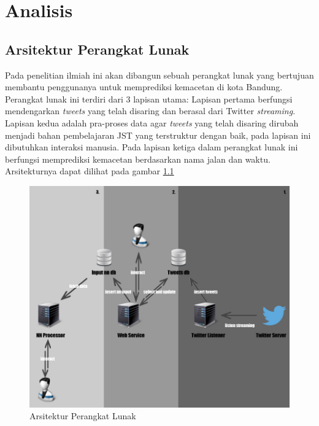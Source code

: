 \chapter{Analisis}
\section{Arsitektur Perangkat Lunak}
Pada penelitian ilmiah ini akan dibangun sebuah perangkat lunak yang bertujuan membantu penggunanya untuk memprediksi kemacetan di kota Bandung. Perangkat lunak ini terdiri dari 3 lapisan utama: Lapisan pertama berfungsi mendengarkan \textit{tweets} yang telah disaring dan berasal dari Twitter \textit{streaming}. Lapisan kedua adalah pra-proses data agar \textit{tweets} yang telah disaring dirubah menjadi bahan pembelajaran JST yang terstruktur dengan baik, pada lapisan ini dibutuhkan interaksi manusia. Pada lapisan ketiga dalam perangkat lunak ini berfungsi memprediksi kemacetan berdasarkan nama jalan dan waktu. Arsitekturnya dapat dilihat pada gambar \ref{fig:arsitekturpl}
\begin{figure}
\centering
\includegraphics[width=0.6\linewidth]{Gambar/mine/sistem}
\caption[Arsitektur Perangkat Lunak]{Arsitektur Perangkat Lunak} 
\label{fig:arsitekturpl}
\end{figure}
